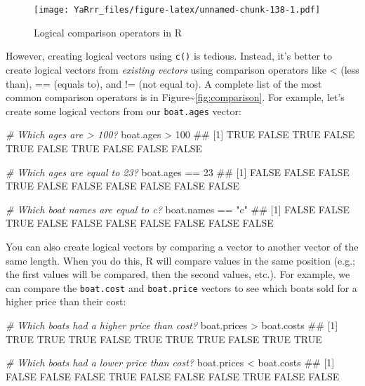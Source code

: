 \documentclass[]{book}
\newenvironment{Shaded}{\begin{snugshade}}{\end{snugshade}}
\newcommand{\DecValTok}[1]{\textcolor[rgb]{0.00,0.00,0.81}{{#1}}}
\newcommand{\StringTok}[1]{\textcolor[rgb]{0.31,0.60,0.02}{{#1}}}
\newcommand{\CommentTok}[1]{\textcolor[rgb]{0.56,0.35,0.01}{\textit{{#1}}}}
\newcommand{\NormalTok}[1]{{#1}}
\theoremstyle{definition}
\theoremstyle{definition}
\theoremstyle{remark}
\begin{document}
\begin{figure}[htbp]
\centering
\texttt{[image: YaRrr\_files/figure-latex/unnamed-chunk-138-1.pdf]}
\caption{\label{fig:unnamed-chunk-138}Logical comparison operators in R}
\end{figure}

However, creating logical vectors using \texttt{c()} is tedious.
Instead, it's better to create logical vectors from \emph{existing
vectors} using comparison operators like \textless{} (less than), ==
(equals to), and != (not equal to). A complete list of the most common
comparison operators is in Figure\textasciitilde{}\ref{fig:comparison}.
For example, let's create some logical vectors from our
\texttt{boat.ages} vector:

\begin{Shaded}
\begin{Highlighting}[]
\CommentTok{# Which ages are > 100?}
\NormalTok{boat.ages >}\StringTok{ }\DecValTok{100}
\NormalTok{##  [1]  TRUE FALSE  TRUE FALSE  TRUE FALSE  TRUE FALSE FALSE FALSE}

\CommentTok{# Which ages are equal to 23?}
\NormalTok{boat.ages ==}\StringTok{ }\DecValTok{23}
\NormalTok{##  [1] FALSE FALSE FALSE  TRUE FALSE FALSE FALSE FALSE FALSE FALSE}

\CommentTok{# Which boat names are equal to c?}
\NormalTok{boat.names ==}\StringTok{ "c"}
\NormalTok{##  [1] FALSE FALSE  TRUE FALSE FALSE FALSE FALSE FALSE FALSE FALSE}
\end{Highlighting}
\end{Shaded}

You can also create logical vectors by comparing a vector to another
vector of the same length. When you do this, R will compare values in
the same position (e.g.; the first values will be compared, then the
second values, etc.). For example, we can compare the \texttt{boat.cost}
and \texttt{boat.price} vectors to see which boats sold for a higher
price than their cost:

\begin{Shaded}
\begin{Highlighting}[]
\CommentTok{# Which boats had a higher price than cost?}
\NormalTok{boat.prices >}\StringTok{ }\NormalTok{boat.costs}
\NormalTok{##  [1]  TRUE  TRUE  TRUE FALSE  TRUE  TRUE  TRUE FALSE  TRUE  TRUE}

\CommentTok{# Which boats had a lower price than cost?}
\NormalTok{boat.prices <}\StringTok{ }\NormalTok{boat.costs}
\NormalTok{##  [1] FALSE FALSE FALSE  TRUE FALSE FALSE FALSE  TRUE FALSE FALSE}
\end{Highlighting}
\end{Shaded}
\end{document}
